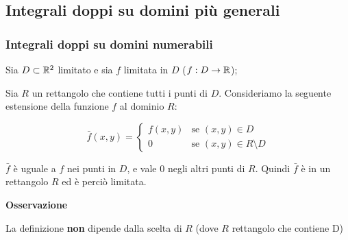 \subsection{Integrali doppi su domini più generali}

\subsubsection{Integrali doppi su domini numerabili}

Sia \(D \subset \mathbb{R}^2 \) limitato e sia \(f\) limitata in \(D\) (\(f: D \to \mathbb{R} \));

Sia \(R\) un rettangolo che contiene tutti i punti di \(D\). Consideriamo la seguente estensione della funzione \(f\) al dominio \(R\):

\[
    \bar{f} (x,y) = \begin{cases}
        f(x,y) & \text{se \((x,y) \in D\)}              \\
        0      & \text{se \((x,y) \in R \setminus D \)}
    \end{cases}
\]

\(\bar{f} \) è uguale a \(f\) nei punti in \(D\), e vale 0 negli altri punti di \(R\). Quindi \(\bar{f}\) è in un rettangolo \(R\) ed è perciò limitata.



\textbf{Osservazione}

La definizione \textbf{non} dipende dalla scelta di \(R\) (dove \(R\) rettangolo che contiene D)




